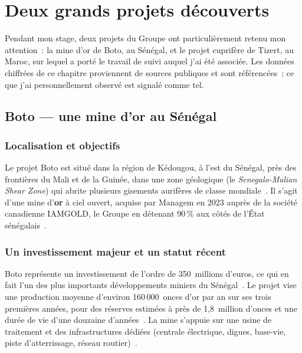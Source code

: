 \chapter{Deux grands projets découverts}
\label{chap:projets}

Pendant mon stage, deux projets du Groupe ont particulièrement retenu mon attention~: la mine d'or de Boto, au Sénégal, et le projet cuprifère de Tizert, au Maroc, sur lequel a porté le travail de suivi auquel j'ai été associée. Les données chiffrées de ce chapitre proviennent de sources publiques et sont référencées~; ce que j'ai personnellement observé est signalé comme tel.

\section{Boto --- une mine d'or au Sénégal}

\subsection{Localisation et objectifs}

Le projet Boto est situé dans la région de Kédougou, à l'est du Sénégal, près des frontières du Mali et de la Guinée, dans une zone géologique (le \textit{Senegalo-Malian Shear Zone}) qui abrite plusieurs gisements aurifères de classe mondiale~\cite{managem_boto}. Il s'agit d'une mine d'\textbf{or} à ciel ouvert, acquise par Managem en 2023 auprès de la société canadienne IAMGOLD, le Groupe en détenant 90\,\% aux côtés de l'État sénégalais~\cite{allafrica_boto}.

\subsection{Un investissement majeur et un statut récent}

Boto représente un investissement de l'ordre de 350~millions d'euros, ce qui en fait l'un des plus importants développements miniers du Sénégal~\cite{managem_boto,northafrica_boto}. Le projet vise une production moyenne d'environ 160\,000~onces d'or par an sur ses trois premières années, pour des réserves estimées à près de 1,8~million d'onces et une durée de vie d'une douzaine d'années~\cite{managem_boto}. La mine s'appuie sur une usine de traitement et des infrastructures dédiées (centrale électrique, digues, base-vie, piste d'atterrissage, réseau routier)~\cite{northafrica_boto}.

